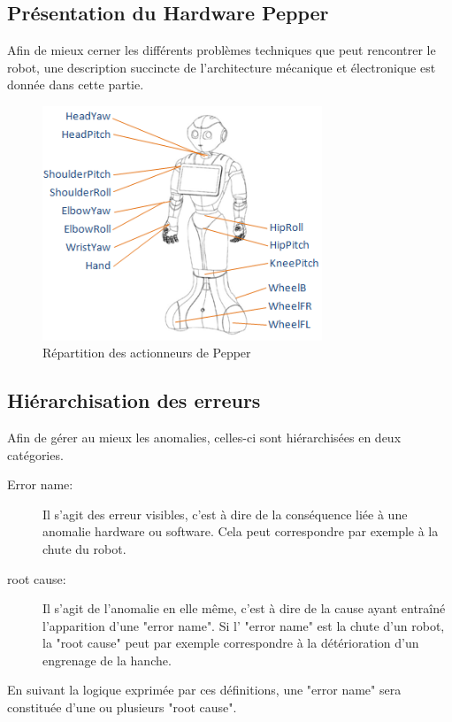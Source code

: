 \subsection{Présentation du Hardware Pepper}
\label{Introduction:Expression du besoin:Présentation du produit}
Afin de mieux cerner les différents problèmes techniques que peut rencontrer le robot, une description succincte de l'architecture mécanique et électronique est donnée dans cette partie. 

\begin{figure}[h]
	\centering\includegraphics[height=7cm]{images/pepper_motors.png}
	\caption{Répartition des actionneurs de Pepper}
	\label{fig:Répartition des actionneurs de Pepper}
\end{figure}
 
\subsection{Hiérarchisation des erreurs}
\label{Introduction:Expression du besoin:Hiérarchisation des erreurs}
Afin de gérer au mieux les anomalies, celles-ci sont hiérarchisées en deux catégories.
\begin{description}
	\item [Error name: ] Il s'agit des erreur visibles, c'est à dire de la conséquence liée à une anomalie hardware ou software. Cela peut correspondre par exemple à la chute du robot. 
	\item [root cause: ] Il s'agit de l'anomalie en elle même, c'est à dire de la cause ayant entraîné l'apparition d'une "error name". Si l' "error name" est la chute d'un robot, la "root cause" peut par exemple correspondre à la détérioration d'un engrenage de la hanche.   
\end{description} 

En suivant la logique exprimée par ces définitions, une "error name" sera constituée d'une ou plusieurs "root cause". 

